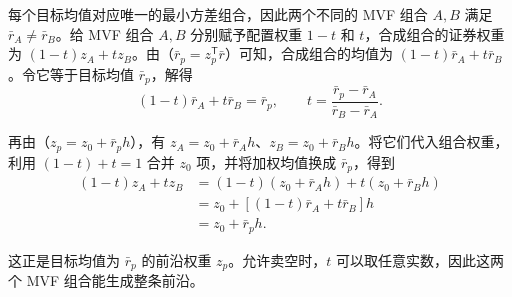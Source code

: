 \begin{center}
\begin{minipage}[t]{0.49\linewidth}
\vspace{0pt}
\centering
\renewcommand{\thewjFigure}{\thechapter.S\arabic{wjFigure}}%
%
\begin{minipage}[c][4.8cm][c]{\linewidth}
\centering
{}\par
\end{minipage}\par
{}
\end{minipage}\hfill
\begin{minipage}[t]{0.49\linewidth}
\vspace{0pt}
\centering
\renewcommand{\thewjFigure}{\thechapter.S\arabic{wjFigure}}%
%
\begin{minipage}[c][4.8cm][c]{\linewidth}
\centering
{}\par
\end{minipage}\par
{}
\end{minipage}
\end{center}

\begin{solution}[label-content={证明},blank-type=none]
每个目标均值对应唯一的最小方差组合，因此两个不同的 MVF 组合 $A,B$ 满足 $\bar r_A\ne\bar r_B$。给 MVF 组合 $A,B$ 分别赋予配置权重 $1-t$ 和 $t$，合成组合的证券权重为 $(1-t)z_A+tz_B$。由（$\bar r_p=z_p^{\mathsf T}\bar r$）可知，合成组合的均值为 $(1-t)\bar r_A+t\bar r_B$。令它等于目标均值 $\bar r_p$，解得
\[
 (1-t)\bar r_A+t\bar r_B=\bar r_p,
 \qquad t=\frac{\bar r_p-\bar r_A}{\bar r_B-\bar r_A}.
\]

再由（$z_p=z_0+\bar r_p h$），有 $z_A=z_0+\bar r_A h$、$z_B=z_0+\bar r_B h$。将它们代入组合权重，利用 $(1-t)+t=1$ 合并 $z_0$ 项，并将加权均值换成 $\bar r_p$，得到
\[
 \begin{aligned}
 (1-t)z_A+tz_B
 &=(1-t)(z_0+\bar r_A h)+t(z_0+\bar r_B h)\\
 &=z_0+[(1-t)\bar r_A+t\bar r_B]h\\
 &=z_0+\bar r_p h.
 \end{aligned}
\]

这正是目标均值为 $\bar r_p$ 的前沿权重 $z_p$。允许卖空时，$t$ 可以取任意实数，因此这两个 MVF 组合能生成整条前沿。
\end{solution}


